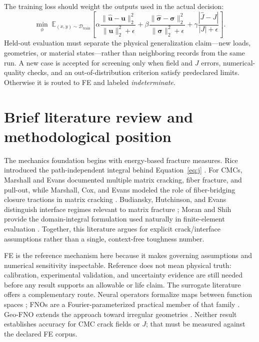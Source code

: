 \documentclass[11pt]{article}
\begin{document}
The training loss should weight the outputs used in the actual decision:
\begin{equation}
 \min_\phi\;\mathbb{E}_{(x,y)\sim\mathcal{D}_{\mathrm{train}}}
 \left[\alpha\frac{\|\widehat{\bm{u}}-\bm{u}\|_2^2}{\|\bm{u}\|_2^2+\epsilon}
 +\beta\frac{\|\widehat{\bm{\sigma}}-\bm{\sigma}\|_2^2}{\|\bm{\sigma}\|_2^2+\epsilon}
 +\gamma\frac{|\widehat{J}-J|}{|J|+\epsilon}\right].
 \label{eq:loss}
\end{equation}
Held-out evaluation must separate the physical generalization claim---new loads,
geometries, or material states---rather than neighboring records from the same
run.  A new case is accepted for screening only when field and $J$ errors,
numerical-quality checks, and an out-of-distribution criterion satisfy
predeclared limits.  Otherwise it is routed to FE and labeled \emph{indeterminate}.

\section{Brief literature review and methodological position}

The mechanics foundation begins with energy-based fracture measures.  Rice
introduced the path-independent integral behind Equation~\eqref{eq:j}
\citep{rice1968}.  For CMCs, Marshall and Evans documented multiple matrix
cracking, fiber fracture, and pull-out, while Marshall, Cox, and Evans modeled
the role of fiber-bridging closure tractions in matrix cracking
\citep{marshallEvans1985,marshallCoxEvans1985}.  Budiansky, Hutchinson, and
Evans distinguish interface regimes relevant to matrix fracture
\citep{budiansky1986}; Moran and Shih provide the domain-integral formulation
used naturally in finite-element evaluation \citep{moranShih1987}.  Together,
this literature argues for explicit crack/interface assumptions rather than a
single, context-free toughness number.

FE is the reference mechanism here because it makes governing assumptions and
numerical sensitivity inspectable.  Reference does not mean physical truth:
calibration, experimental validation, and uncertainty evidence are still needed
before any result supports an allowable or life claim.  The surrogate literature
offers a complementary route.  Neural operators formalize maps between function
spaces \citep{kovachki2023}; FNOs are a Fourier-parameterized practical member
of that family \citep{li2021fno}.  Geo-FNO extends the approach toward irregular
geometries \citep{li2022geofno}.  Neither result establishes accuracy for CMC
crack fields or $J$; that must be measured against the declared FE corpus.
\end{document}
